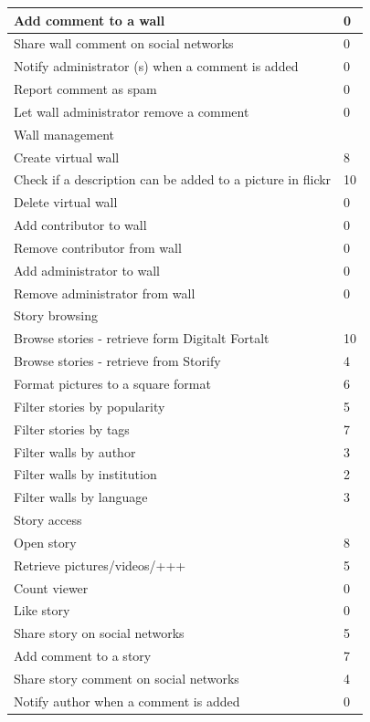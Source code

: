 \documentclass[11pt]{book}
\begin{document}
\begin{center}
\begin{longtable}{| l | l |}
		\hline
		Add comment to a wall & 0\\
		\hline
		Share wall comment on social networks & 0\\
		\hline
		Notify administrator (s) when a comment is added & 0\\
		\hline
		Report comment as spam & 0\\
		\hline
		Let wall administrator remove a comment & 0\\
		\hline
		Wall management & \\
		\hline
		Create virtual wall & 8\\
		\hline
		Check if a description can be added to a picture in flickr & 10\\
		\hline
		Delete virtual wall & 0\\
		\hline
		Add contributor to wall & 0\\
		\hline
		Remove contributor from wall & 0\\
		\hline
		Add administrator to wall & 0\\
		\hline
		Remove administrator from wall & 0\\
		\hline	
		Story browsing & \\
		\hline
		Browse stories - retrieve form Digitalt Fortalt & 10\\
		\hline
		Browse stories - retrieve from Storify & 4\\
		\hline
		Format pictures to a square format & 6\\
		\hline
		Filter stories by popularity & 5\\
		\hline
		Filter stories by tags & 7\\
		\hline	
		Filter walls by author & 3\\
		\hline
		Filter walls by institution & 2\\
		\hline
		Filter walls by language & 3\\
		\hline
		Story access & \\
		\hline
		Open story & 8\\
		\hline
		Retrieve pictures/videos/+++ & 5\\
		\hline
		Count viewer & 0\\
		\hline
		Like story & 0\\
		\hline
		Share story on social networks & 5\\
		\hline
		Add comment to a story & 7\\
		\hline
		Share story comment on social networks & 4\\
		\hline
		Notify author when a comment is added	 & 0\\

\end{longtable}
\end{center}
\end{document}
